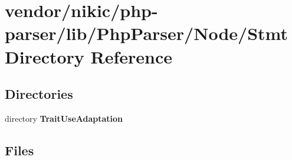 \section{vendor/nikic/php-\/parser/lib/\+Php\+Parser/\+Node/\+Stmt Directory Reference}
\label{dir_901b9d0c246cca71118908d769b0fecf}
\subsection*{Directories}
\begin{DoxyCompactItemize}
\item 
directory {\bf Trait\+Use\+Adaptation}
\end{DoxyCompactItemize}
\subsection*{Files}
